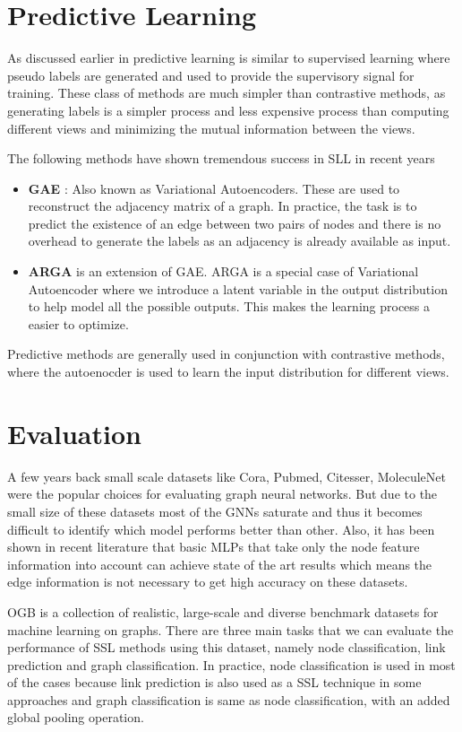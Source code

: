 \documentclass{article}
\begin{document}
\section{Predictive Learning}
As discussed earlier in predictive learning is similar to supervised learning where pseudo labels are generated and used to provide the supervisory signal for training. These class of methods are much simpler than contrastive methods, as generating labels is a simpler process and less expensive process than computing different views and minimizing the mutual information between the views.

The following methods have shown tremendous success in SLL in recent years
\begin{itemize}
    \item \textbf{GAE} \citep{cite21}: Also known as Variational Autoencoders. These are used to reconstruct the adjacency matrix of a graph. In practice, the task is to predict the existence of an edge between two pairs of nodes and there is no overhead to generate the labels as an adjacency is already available as input.
    \item \textbf{ARGA} \citep{cite22} is an extension of GAE. ARGA is a special case of Variational Autoencoder where we introduce a latent variable in the output distribution to help model all the possible outputs. This makes the learning process a easier to optimize.
\end{itemize}

Predictive methods are generally used in conjunction with contrastive methods, where the autoenocder is used to learn the input distribution for different views.

\section{Evaluation}
A few years back small scale datasets like Cora, Pubmed, Citesser, MoleculeNet were the popular choices for evaluating graph neural networks. But due to the small size of these datasets most of the GNNs saturate and thus it becomes difficult to identify which model performs better than other. Also, it has been shown in recent literature that basic MLPs that take only the node feature information into account can achieve state of the art results which means the edge information is not necessary to get high accuracy on these datasets.

OGB \citep{cite23} is a collection of realistic, large-scale and diverse benchmark datasets for machine learning on graphs. There are three main tasks that we can evaluate the performance of SSL methods using this dataset, namely node classification, link prediction and graph classification. In practice, node classification is used in most of the cases because link prediction is also used as a SSL technique in some approaches and graph classification is same as node classification, with an added global pooling operation.
\end{document}
